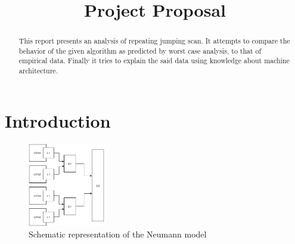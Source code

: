 \documentclass[conference]{IEEEtran}
\begin{document}
\title{Project Proposal}

\author{
\and
{}
\and
{}
}

\maketitle

\begin{abstract}
This report presents an analysis of repeating jumping scan. It attempts to compare the behavior of the given algorithm as predicted by worst case analysis, to that of empirical data. Finally it tries to explain the said data using knowledge about machine architecture.
\end{abstract}

\section{Introduction}
\begin{figure}[H]
	\begin{center}
		\includegraphics[width=0.3\textwidth]{images/Diagram_1.png}
		\caption[]{Schematic representation of the Neumann model}
	\end{center}	
\end{figure}
\end{document}
